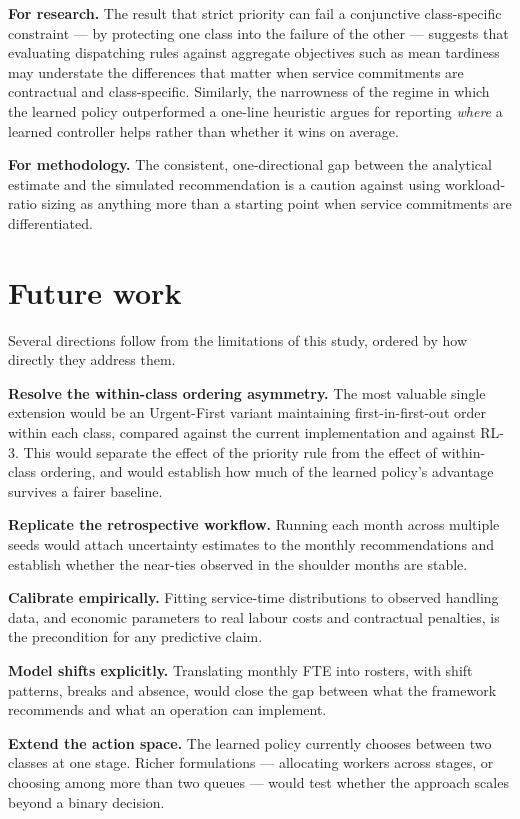 \textbf{For research.} The result that strict priority can fail a conjunctive class-specific
constraint --- by protecting one class into the failure of the other --- suggests that
evaluating dispatching rules against aggregate objectives such as mean tardiness may understate
the differences that matter when service commitments are contractual and class-specific.
Similarly, the narrowness of the regime in which the learned policy outperformed a one-line
heuristic argues for reporting \emph{where} a learned controller helps rather than whether it
wins on average.

\textbf{For methodology.} The consistent, one-directional gap between the analytical estimate
and the simulated recommendation is a caution against using workload-ratio sizing as anything
more than a starting point when service commitments are differentiated.

\section{Future work}
\label{sec:future-work}

Several directions follow from the limitations of this study, ordered by how directly they
address them.

\textbf{Resolve the within-class ordering asymmetry.} The most valuable single extension would
be an Urgent-First variant maintaining first-in-first-out order within each class, compared
against the current implementation and against RL-3. This would separate the effect of the
priority rule from the effect of within-class ordering, and would establish how much of the
learned policy's advantage survives a fairer baseline.

\textbf{Replicate the retrospective workflow.} Running each month across multiple seeds would
attach uncertainty estimates to the monthly recommendations and establish whether the
near-ties observed in the shoulder months are stable.

\textbf{Calibrate empirically.} Fitting service-time distributions to observed handling data,
and economic parameters to real labour costs and contractual penalties, is the precondition for
any predictive claim.

\textbf{Model shifts explicitly.} Translating monthly FTE into rosters, with shift patterns,
breaks and absence, would close the gap between what the framework recommends and what an
operation can implement.

\textbf{Extend the action space.} The learned policy currently chooses between two classes at
one stage. Richer formulations --- allocating workers across stages, or choosing among more
than two queues --- would test whether the approach scales beyond a binary decision.

